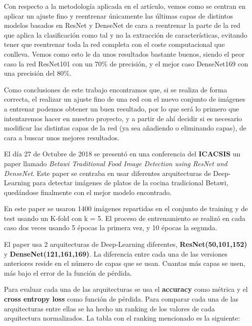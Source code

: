 Con respecto a la metodología aplicada en el artículo, vemos como se centran en aplicar un ajuste fino y reentrenar únicamente las últimas capas de distintos modelos basados en ResNet y DenseNet de cara a reentrenar la parte de la red que aplica la clasificación como tal y no la extracción de características, evitando tener que reentrenar toda la red completa con el coste computacional que conlleva. Vemos como esto le da unos resultados bastante buenos, siendo el peor caso la red ResNet101 con un 70\% de precisión, y el mejor caso DenseNet169 con una precisión del 80\%.


Como conclusiones de este trabajo encontramos que, si se realiza de forma correcta, el realizar un ajuste fino de una red con el nuevo conjunto de imágenes a entrenar podemos obtener un buen resultado, por lo que será lo primero que intentaremos hacer en nuestro proyecto, y a partir de ahí decidir si es necesario modificar las distintas capas de la red (ya sea añadiendo o eliminando capas), de cara a buscar unos mejores resultados.


\vspace{5 mm}

El día 27 de Octubre de 2018 se presentó en una conferencia del \textbf{ICACSIS} un paper llamado \textit{Betawi Traditional Food Image Detection using
ResNet and DenseNet}. Este paper se centraba en usar diferentes arquitecturas de Deep-Learning para detectar imágenes de platos de la cocina tradicional Betawi, quedándose finalmente con el mejor modelo encontrado.

\vspace{3 mm}

En este paper se usaron 1400 imágenes repartidas en el conjunto de training y de test usando un K-fold con k = 5. El proceso de entrenamiento se realizó en cada caso dos veces usando 5 épocas la primera vez, y 10 épocas la segunda.

\vspace{3 mm}

El paper usa 2 arquitecturas de Deep-Learning diferentes, \textbf{ResNet(50,101,152)} y \textbf{DenseNet(121,161,169)}. La diferencia entre cada una de las versiones anteriores reside en el número de capas que se usan. Cuantas más capas se usen, más bajo el error de la función de pérdida.

\vspace{3 mm}

Para evaluar cada una de las arquitecturas se usa el \textbf{accuracy} como métrica y el \textbf{cross entropy loss} como función de pérdida. Para comparar cada una de las arquitecturas entre ellas se ha hecho un ranking de los valores de cada arquitectura normalizados. La tabla con el ranking mencionado es la siguiente:

